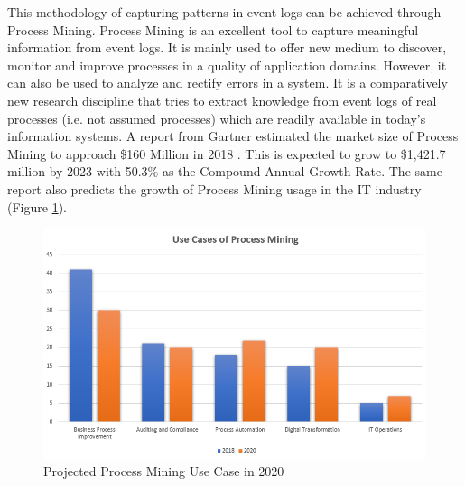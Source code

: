 This methodology of capturing patterns in event logs can be achieved through Process Mining. Process Mining is an excellent tool to capture meaningful information from event logs. It is mainly used to offer new medium to discover, monitor and improve processes in a quality of application domains. However, it can also be used to analyze and rectify errors in a system. It is a comparatively new research discipline that tries to extract knowledge from event logs of real processes (i.e. not assumed processes) which are readily available in today’s information systems. A report from Gartner estimated the market size of Process Mining to approach \$160 Million in 2018 \cite{Gartner2019}. This is expected to grow to \$1,421.7 million by 2023 with 50.3\% as the Compound Annual Growth Rate\cite{PressRelease2018}. The same report also predicts the growth of Process Mining usage in the IT industry (Figure \ref{fig:PMUseCase}). 

\begin{figure}[h]
	\centering
	\includegraphics[width=\columnwidth]{images/use_case_process_mining.png}
	\caption{Projected Process Mining Use Case in 2020}
	\label{fig:PMUseCase}
\end{figure}

